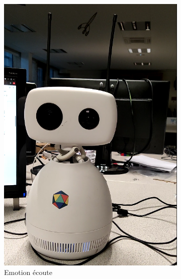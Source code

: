 \documentclass[a4paper,french]{article}
\begin{document}
\begin{figure}[!ht]
    \centering
    \begin{subfigure}{0.25\textwidth}
        \includegraphics[width=\textwidth]{figures/ecoute.png}
        \caption{Emotion écoute}
        \label{ecoute}
    \end{subfigure}
    \begin{subfigure}{0.25\textwidth}

\end{subfigure}
\end{figure}
\end{document}
